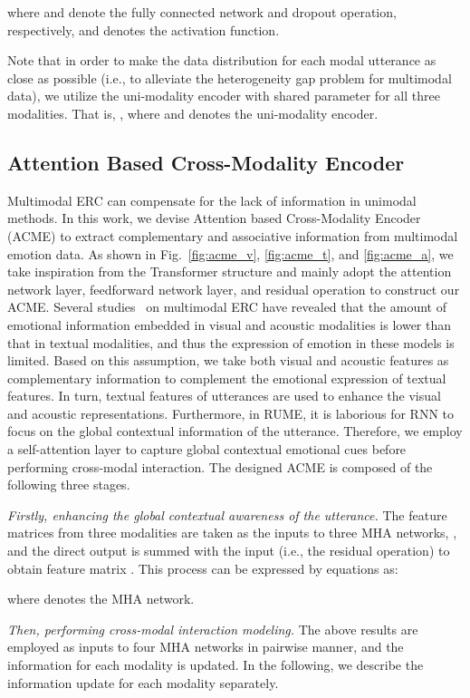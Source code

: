 \documentclass[journal]{IEEEtran}
\begin{document}
where  and  denote the fully connected network and dropout operation, respectively, and  denotes the activation function.

Note that in order to make the data distribution for each modal utterance as close as possible (i.e., to alleviate the heterogeneity gap problem for multimodal data), we utilize the uni-modality encoder with shared parameter for all three modalities. That is, , where  and  denotes the uni-modality encoder.

\subsection{Attention Based Cross-Modality Encoder}
Multimodal ERC can compensate for the lack of information in unimodal methods. In this work, we devise Attention based Cross-Modality Encoder (ACME) to extract complementary and associative information from multimodal emotion data. As shown in Fig.~\ref{fig:acme_v}, \ref{fig:acme_t}, and \ref{fig:acme_a}, we take inspiration from the Transformer structure and mainly adopt the attention network layer, feedforward network layer, and residual operation to construct our ACME. Several studies~\cite{hu2021mmgcn,mao2021dialoguetrm} on multimodal ERC have revealed that the amount of emotional information embedded in visual and acoustic modalities is lower than that in textual modalities, and thus the expression of emotion in these models is limited. Based on this assumption, we take both visual and acoustic features as complementary information to complement the emotional expression of textual features. In turn, textual features of utterances are used to enhance the visual and acoustic representations. Furthermore, in RUME, it is laborious for RNN to focus on the global contextual information of the utterance. Therefore, we employ a self-attention layer to capture global contextual emotional cues before performing cross-modal interaction. The designed ACME is composed of the following three stages.

\textit{Firstly, enhancing the global contextual awareness of the utterance.} The feature matrices  from three modalities are taken as the inputs to three MHA networks, , and the direct output  is summed with the input  (i.e., the residual operation) to obtain feature matrix . This process can be expressed by equations as:

where  denotes the MHA network.

\textit{Then, performing cross-modal interaction modeling.} The above results are employed as inputs to four MHA networks in pairwise manner, and the information for each modality is updated. In the following, we describe the information update for each modality separately.
\end{document}
